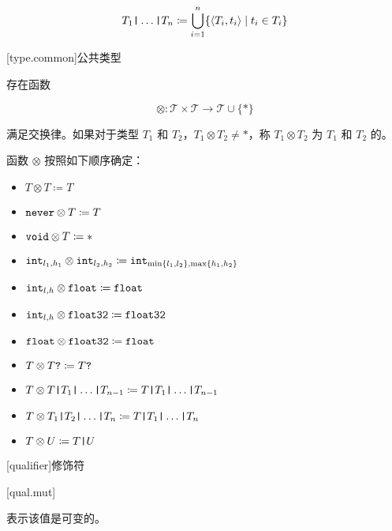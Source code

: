 $$ T_1 \texttt{|} \ldots \texttt{|} T_n \coloneqq \bigcup^n_{i=1} \{ \langle T_i, t_i \rangle \mid t_i \in T_i \} $$

[type.common]{公共类型}

\pnum
存在函数

$$ \otimes: \mathcal{T} \times \mathcal{T} \rightarrow \mathcal{T} \cup \{ \ast \} $$

满足交换律。如果对于类型 $T_1$ 和 $T_2$，$T_1 \otimes T_2 \ne \ast$，称 $T_1 \otimes T_2$ 为 $T_1$ 和 $T_2$ 的。

\pnum
函数 $\otimes$ 按照如下顺序确定：

\begin{itemize}
\item $T \otimes T \coloneqq T$
\item $\texttt{never} \otimes T \coloneqq T$
\item $\texttt{void} \otimes T \coloneqq \ast$
\item $\texttt{int}_{l_1,h_1} \otimes \texttt{int}_{l_2,h_2} \coloneqq \texttt{int}_{\min\{l_1, l_2\},\max\{h_1, h_2\}}$
\item $\texttt{int}_{l,h} \otimes \texttt{float} \coloneqq \texttt{float}$
\item $\texttt{int}_{l,h} \otimes \texttt{float32} \coloneqq \texttt{float32}$
\item $\texttt{float} \otimes \texttt{float32} \coloneqq \texttt{float}$
\item $T \otimes T\texttt{?} \coloneqq T\texttt{?}$
\item $T \otimes T \texttt{|} T_1 \texttt{|} \ldots \texttt{|} T_{n-1} \coloneqq T \texttt{|} T_1 \texttt{|} \ldots \texttt{|} T_{n-1}$
\item $T \otimes T_1 \texttt{|} T_2 \texttt{|} \ldots \texttt{|} T_n \coloneqq T \texttt{|} T_1 \texttt{|} \ldots \texttt{|} T_n$
\item $T \otimes U \coloneqq T \texttt{|} U$
\end{itemize}

[qualifier]{修饰符}

[qual.mut]{}

\pnum
{} 表示该值是可变的。
